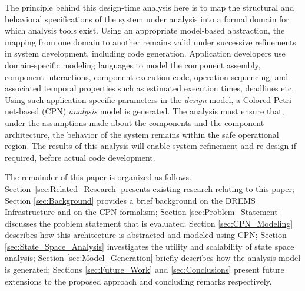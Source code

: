 The principle behind this design-time analysis here is to map the structural and behavioral specifications of the system under analysis into a formal domain for which analysis tools exist. Using an appropriate model-based abstraction, the mapping from one domain to another remains valid under successive refinements in system development, including code generation. Application developers use domain-specific modeling languages to model the component assembly, component interactions, component execution code, operation sequencing, and associated temporal properties such as estimated execution times, deadlines etc. Using such application-specific parameters in the \textit{design} model, a Colored Petri net-based (CPN) \cite{CPN} \textit{analysis} model is generated. The analysis must ensure that, under the assumptions made about the components and the component architecture, the behavior of the system remains within the safe operational region. The results of this analysis will enable system refinement and re-design if required, before actual code development. 

The remainder of this paper is organized as follows. Section~\ref{sec:Related_Research} presents existing research relating to this paper; Section \ref{sec:Background} provides a brief background on the DREMS Infrastructure and on the CPN formalism; Section \ref{sec:Problem_Statement} discusses the problem statement that is evaluated; Section \ref{sec:CPN_Modeling} describes how this architecture is abstracted and modeled using CPN; Section \ref{sec:State_Space_Analysis} investigates the utility and scalability of state space analysis; Section \ref{sec:Model_Generation} briefly describes how the analysis model is generated; Sections \ref{sec:Future_Work} and \ref{sec:Conclusions} present future extensions to the proposed approach and concluding remarks respectively.